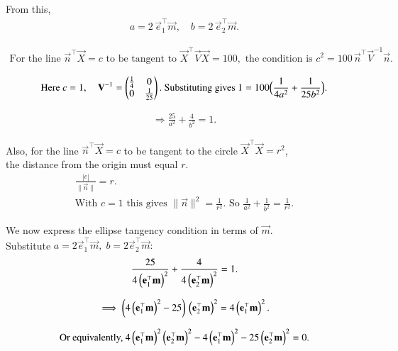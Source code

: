 \documentclass[journal]{IEEEtran}
\begin{document}
From this,
\begin{align}
a = 2\,\vec{e}_1^\top\vec{m},\quad
b = 2\,\vec{e}_2^\top\vec{m}.
\end{align}

\begin{align*}
\text{For the line } \vec{n}^\top\vec{X}=c \text{ to be tangent to } 
\vec{X}^\top\vec{V}\vec{X}=100,\text{ the condition is } 
c^2 = 100\,\vec{n}^\top\vec{V}^{-1}\vec{n}.
\end{align*}

\begin{align}
\text{Here } c=1,\quad
\mathbf{V}^{-1}=\begin{pmatrix}\tfrac{1}{4} & 0 \\ 0 & \tfrac{1}{25}\end{pmatrix}.
\text{ Substituting gives }
1 = 100\Big(\frac{1}{4a^2}+\frac{1}{25b^2}\Big).
\end{align}

\begin{align}
\Rightarrow \frac{25}{a^2}+\frac{4}{b^2}=1.
\end{align}


Also, for the line $\vec{n}^\top\vec{X}=c$ to be tangent to the circle $\vec{X}^\top\vec{X}=r^2$,\\ 
the distance from the origin must equal $r$.
\begin{align}
    \frac{|c|}{\|\vec{n}\|}=r.\\
    \text{With } c=1 \text{ this gives } \|\vec{n}\|^2 = \frac{1}{r^2}.
    \text{ So }
    \frac{1}{a^2}+\frac{1}{b^2}=\frac{1}{r^2}.
\end{align}

We now express the ellipse tangency condition in terms of $\vec{m}$.\\
Substitute $a=2\vec{e}_1^\top\vec{m},\; b=2\vec{e}_2^\top\vec{m}:$
\begin{align}
\frac{25}{4\left(\mathbf{e}_1^\top\mathbf{m}\right)^2}+\frac{4}{4\left(\mathbf{e}_2^\top\mathbf{m}\right)^2}=1.
\end{align}


\begin{align}
\implies \left(4\left(\mathbf{e}_1^\top\mathbf{m}\right)^2-25\right)\,\left(\mathbf{e}_2^\top\mathbf{m}\right)^2
=4\left(\mathbf{e}_1^\top\mathbf{m}\right)^2.
\end{align}

\begin{align}
\text{Or equivalently, }
4\left(\mathbf{e}_1^\top\mathbf{m}\right)^2\left(\mathbf{e}_2^\top\mathbf{m}\right)^2
-4\left(\mathbf{e}_1^\top\mathbf{m}\right)^2
-25\left(\mathbf{e}_2^\top\mathbf{m}\right)^2
=0.
\end{align}
\end{document}

